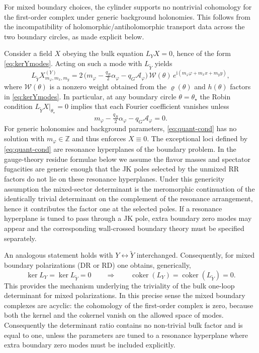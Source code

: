 \documentclass[11pt,a4paper]{article}
\numberwithin{equation}{section}
\theoremstyle{plain}
\theoremstyle{definition}
\theoremstyle{remark}
\newcommand{\ii}{\mathrm{i}}
\begin{document}
For mixed boundary choices, the cylinder supports no nontrivial cohomology for the first-order complex under generic background holonomies. This follows from the incompatibility of holomorphic/antiholomorphic transport data across the two boundary circles, as made explicit below.


Consider a field $X$ obeying the bulk equation $L_Y X=0$, hence of the form \eqref{eq:kerYmodes}. Acting on such a mode with $L_{\widetilde Y}$ yields
\begin{equation}
L_{\widetilde Y} X^{(Y)}_{m_\varphi,m_x,m_y}
=
2\,\big(m_\varphi-\tfrac{q_R}{2}\alpha_\varphi-q_G \mathcal A_\varphi\big)\,
\mathcal{W}(\theta)\,
e^{\ii(m_\varphi\varphi+m_x x+m_y y)},
\label{eq:LYtil-on-kerY}
\end{equation}
where $\mathcal{W}(\theta)$ is a nonzero weight obtained from the $\varrho(\theta)$ and $h(\theta)$ factors in \eqref{eq:kerYmodes}. In particular, at any boundary circle $\theta=\theta_\star$ the Robin condition $L_{\widetilde Y}X|_{\theta_\star}=0$ implies that each Fourier coefficient vanishes unless
\begin{equation}
m_\varphi-\tfrac{q_R}{2}\alpha_\varphi-q_G \mathcal A_\varphi=0.
\label{eq:quant-cond}
\end{equation}
For generic holonomies and background parameters, \eqref{eq:quant-cond} has no solution with $m_\varphi\in\mathbb{Z}$ and thus enforces $X\equiv 0$.  The exceptional loci defined by \eqref{eq:quant-cond} are resonance hyperplanes of the boundary problem.  In the gauge-theory residue formulae below we assume the flavor masses and spectator fugacities are generic enough that the JK poles selected by the unmixed RR factors do not lie on these resonance hyperplanes.  Under this genericity assumption the mixed-sector determinant is the meromorphic continuation of the identically trivial determinant on the complement of the resonance arrangement, hence it contributes the factor one at the selected poles.  If a resonance hyperplane is tuned to pass through a JK pole, extra boundary zero modes may appear and the corresponding wall-crossed boundary theory must be specified separately.

An analogous statement holds with $Y\leftrightarrow \widetilde Y$ interchanged. Consequently, for mixed boundary polarizations (DR or RD) one obtains, generically,
\begin{equation}
\ker L_Y=\ker L_{\widetilde Y}=0
\qquad\Longrightarrow\qquad
\operatorname{coker}(L_Y)=\operatorname{coker}(L_{\widetilde Y})=0.
\label{eq:acyclic-mixed}
\end{equation}
This provides the mechanism underlying the triviality of the bulk one-loop determinant for mixed polarizations.  In this precise sense the mixed boundary complexes are acyclic: the cohomology of the first-order complex is zero, because both the kernel and the cokernel vanish on the allowed space of modes.  Consequently the determinant ratio contains no non-trivial bulk factor and is equal to one, unless the parameters are tuned to a resonance hyperplane where extra boundary zero modes must be included explicitly.
\end{document}
